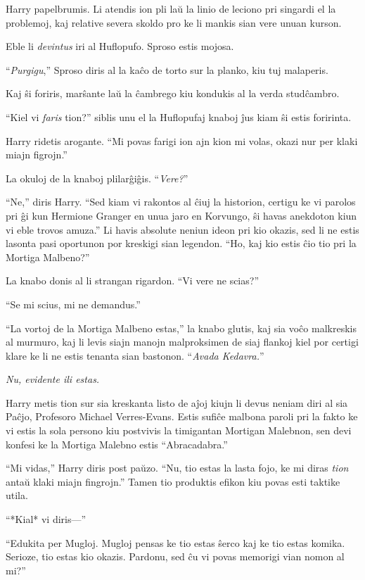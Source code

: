 Harry papelbrumis. Li atendis ion pli laŭ la linio de leciono pri singardi el la
problemoj, kaj relative severa skoldo pro ke li mankis sian vere unuan kurson.

Eble li \emph{devintus} iri al Huflopufo. Sproso estis mojosa.

``\emph{Purgigu},'' Sproso diris al la kaĉo de torto sur la planko, kiu tuj
malaperis.

Kaj ŝi foriris, marŝante laŭ la ĉambrego kiu kondukis al la verda studĉambro.


``Kiel vi \emph{faris} tion?'' siblis unu el la Huflopufaj knaboj ĵus
kiam ŝi estis foririnta.

Harry ridetis arogante. ``Mi povas farigi ion ajn kion mi volas, okazi nur per
klaki miajn figrojn.''

La okuloj de la knaboj plilarĝiĝis. ``\emph{Vere?}''

``Ne,'' diris Harry. ``Sed kiam vi rakontos al ĉiuj la historion, certigu ke vi
parolos pri ĝi kun Hermione Granger en unua jaro en Korvungo, ŝi havas anekdoton
kiun vi eble trovos amuza.'' Li havis absolute neniun ideon pri kio okazis, sed
li ne estis lasonta pasi oportunon por kreskigi sian legendon. ``Ho, kaj kio
estis ĉio tio pri la Mortiga Malbeno?''

La knabo donis al li strangan rigardon. ``Vi vere ne scias?''

``Se mi scius, mi ne demandus.''

``La vortoj de la Mortiga Malbeno estas,'' la knabo glutis, kaj sia voĉo
malkreskis al murmuro, kaj li levis siajn manojn malproksimen de siaj flankoj
kiel por certigi klare ke li ne estis tenanta sian bastonon. ``\emph{Avada
Kedavra.}''

\emph{Nu, evidente ili estas.}

Harry metis tion sur sia kreskanta listo de aĵoj kiujn li devus neniam diri al
sia Paĉjo, Profesoro Michael Verres-Evans. Estis sufiĉe malbona paroli pri la
fakto ke vi estis la sola persono kiu postvivis la timigantan Mortigan Malebnon,
sen devi konfesi ke la Mortiga Malebno estis ``Abracadabra.''

``Mi vidas,'' Harry diris post paŭzo. ``Nu, tio estas la lasta fojo,
ke mi diras \emph{tion} antaŭ klaki miajn fingrojn.'' Tamen tio
produktis efikon kiu povas esti taktike utila.

``*Kial* vi diris—''

``Edukita per Mugloj. Mugloj pensas ke tio estas ŝerco kaj ke tio
estas komika. Serioze, tio estas kio okazis. Pardonu, sed ĉu vi povas
memorigi vian nomon al mi?''

